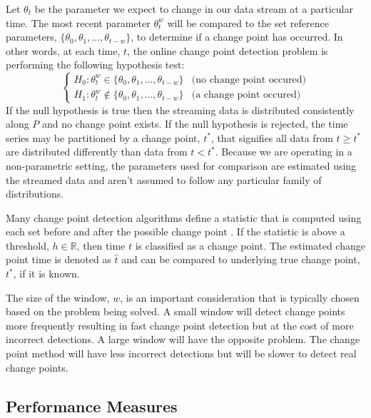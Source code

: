 Let $\theta_t$ be the parameter we expect to change in our data stream at a particular time. The most recent parameter $\theta_t^w$ will be compared to the set reference parameters, $\{\theta_0, \theta_1,...,\theta_{t-w}\}$, to determine if a change point has occurred. In other words, at each time, $t$, the online change point detection problem is performing the following hypothesis test:
\begin{equation}
\label{formula_cpd}
  \begin{cases}
    H_0: \theta_t^w \in \{\theta_0, \theta_1,...,\theta_{t-w}\}  & \text{(no change point occured)} \\
    H_1: \theta_t^w \notin \{\theta_0, \theta_1,...,\theta_{t-w}\}  & \text{(a change point occured)}
  \end{cases}
\end{equation}
If the null hypothesis is true then the streaming data is distributed consistently along $P$ and no change point exists. If the null hypothesis is rejected, the time series may be partitioned by a change point, $t^*$, that signifies all data from $t \geq t^*$ are distributed differently than data from $t<t^*$. Because we are operating in a non-parametric setting, the parameters used for comparison are estimated using the streamed data and aren't assumed to follow any particular family of distributions. 

Many change point detection algorithms define a statistic that is computed using each set before and after the possible change point \cite{aminikhanghahi2017survey}. If the statistic is above a threshold, $h \in \mathbb{R}$, then time $t$ is classified as a change point. The estimated change point time is denoted as $\hat{t}$ and can be compared to underlying true change point, $t^*$, if it is known.

The size of the window, $w$, is an important consideration that is typically chosen based on the problem being solved. A small  window will detect change points more frequently resulting in fast change point detection but at the cost of more incorrect detections. A large window will have the opposite problem. The change point method will have less incorrect detections but will be slower to detect real change points.

\subsection{Performance Measures}

